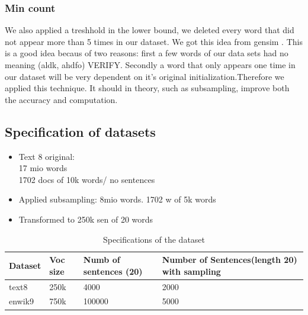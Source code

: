 \subsubsection{Min count}
We also applied a treshhold in the lower bound, we deleted every word that did not appear more than 5 times in our dataset. We got this idea from gensim \cite{gensim}. This is a good idea becaus of two reasons: first a few words of our data sets had no meaning (aldk, ahdfo) VERIFY. Secondly a word that only appears one time in our dataset will be very dependent on it's original initialization.Therefore we applied this technique. It should in theory, such as subsampling, improve both the accuracy and computation. 
\subsection{Specification of datasets}
\begin{itemize}
\item Text 8 original: \\
17 mio words\\
1702 docs of 10k words/ no sentences 
\item Applied subsampling:
8mio words.
1702 w of 5k words
\item Transformed to  250k sen of 20 words
\end{itemize}

\begin{table}[]
\begin{tabular}{|l|l|l|l|}
\hline
Dataset & Voc size & Numb of sentences (20) & Number of Sentences(length 20) with sampling \\ \hline
text8   & 250k     & 4000                   & 2000                                         \\ \hline
enwik9  & 750k     & 100000                 & 5000                                         \\ \hline
\end{tabular}
\caption{Specifications of the dataset}
\end{table}

